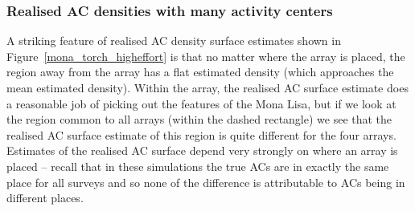 \documentclass[10pt,a4paper]{article}
\begin{document}
\subsubsection{Realised AC densities with many activity centers}


A striking feature of realised AC density surface estimates shown in Figure~\ref{mona_torch_higheffort} is that no matter where the array is placed, the region away from the array has a flat estimated density (which approaches the mean estimated density). Within the array, the realised AC surface estimate does a reasonable job of picking out the features of the Mona Lisa, but if we look at the region common to all arrays (within the dashed rectangle) we see that the realised AC surface estimate of this region is quite different for the four arrays. Estimates of the realised AC surface depend very strongly on where an array is placed -- recall that in these simulations the true ACs are in exactly the same place for all surveys and so none of the difference is attributable to ACs being in different places.

\end{document}
